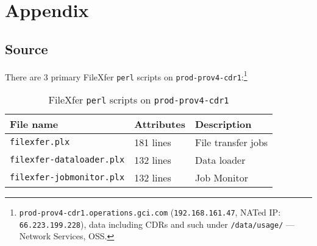 \documentclass[12pt,letterpaper,dvips]{article}
\begin{document}
\setcounter{secnumdepth}{0}
\section{Appendix}


\subsection{Source}
There are 3 primary FileXfer \texttt{perl} scripts on
\texttt{prod-prov4-cdr1}:\footnote{\texttt{prod-prov4-cdr1.operations.gci.com}
  (\texttt{192.168.161.47}, NATed IP: \texttt{66.223.199.228}), data including
  CDRs and such under \texttt{/data/usage/} ---
  Network Services, OSS.}


\begin{table}[htb]
\begin{tabular}{|p{}|p{}|p{}|}\hline 
\textbf{File name}&\textbf{Attributes}&\textbf{Description}\\ 
\hline
\texttt{filexfer.plx}&181 lines&File transfer jobs\\
\texttt{filexfer-dataloader.plx}&132 lines&Data loader\\
\texttt{filexfer-jobmonitor.plx}&132 lines&Job Monitor\\
\hline
\end{tabular}
\caption{FileXfer \texttt{perl} scripts on \texttt{prod-prov4-cdr1}}
\label{table:FileXfer_scripts_on_prod-prov4-cdr1}
\end{table}


\newpage
{}
\end{document}
